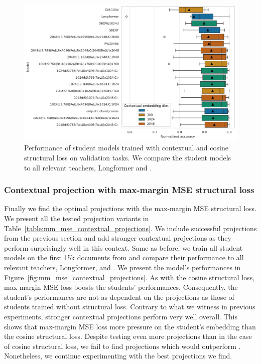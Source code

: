 \begin{figure}

  \includegraphics[width=\textwidth]{img/projections_contextual_cos.pdf}

  \caption{Performance of student models trained with contextual and cosine
  structural loss on validation tasks. We compare the student models to all
  relevant teachers, Longformer and .}

  \label{fig:cos_projections_contextual}

\end{figure}

\subsubsection{Contextual projection with max-margin MSE structural
loss}\label{section:projections_mm_mse}

Finally we find the optimal projections with the max-margin MSE structural
loss. We present all the tested projection variants in
Table~\ref{table:mm_mse_contextual_projections}. We include successful
projections from the previous section and add stronger contextual projections
as they perform surprisingly well in this context. Same as before, we train all
student models on the first 15k documents from  and compare
their performance to all relevant teachers, Longformer, and
. We present the model's performances in
Figure~\ref{fig:mm_mse_contextual_projections}. As with the cosine structural
loss, max-margin MSE loss boosts the students' performances. Consequently, the
student's performances are not as dependent on the projections as those of
students trained without structural loss. Contrary to what we witness in
previous experiments, stronger contextual projections perform very well
overall. This shows that max-margin MSE loss more pressure on the student's
embedding than the cosine structural loss. Despite testing even more
projections than in the case of cosine structural loss, we fail to find
projections which would outperform . Nonetheless,
we continue experimenting with the best projections we find.

